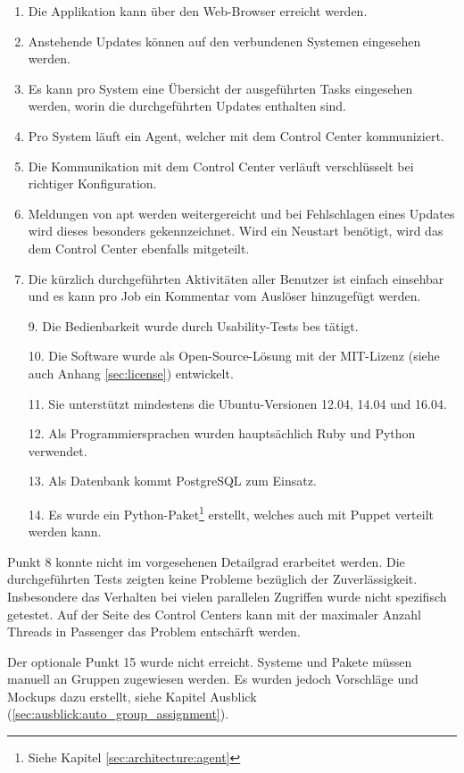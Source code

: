 \begin{enumerate}[noitemsep]
    \item Die Applikation kann über den Web-Browser erreicht werden.
    \item Anstehende Updates können auf den verbundenen Systemen eingesehen werden.
    \item Es kann pro System eine Übersicht der ausgeführten Tasks eingesehen werden, worin die durchgeführten Updates enthalten sind.
    \item Pro System läuft ein Agent, welcher mit dem Control Center kommuniziert.
    \item Die Kommunikation mit dem Control Center verläuft verschlüsselt bei richtiger Konfiguration.
    \item Meldungen von \gls{apt} werden weitergereicht und bei Fehlschlagen eines Updates wird dieses besonders gekennzeichnet. Wird ein Neustart benötigt, wird das dem Control Center ebenfalls mitgeteilt.
    \item Die kürzlich durchgeführten Aktivitäten aller Benutzer ist einfach einsehbar und es kann pro Job ein Kommentar vom Auslöser hinzugefügt werden.
    \item [9.] Die Bedienbarkeit wurde durch Usability-Tests bes    tätigt.
    \item [10.] Die Software wurde als Open-Source-Lösung mit der MIT-Lizenz (siehe auch Anhang \ref{sec:license}) entwickelt.
    \item [11.] Sie unterstützt mindestens die Ubuntu-Versionen 12.04, 14.04 und 16.04.
    \item [12.] Als Programmiersprachen wurden hauptsächlich Ruby und Python verwendet.
    \item [13.] Als Datenbank kommt PostgreSQL zum Einsatz.
    \item [14.] Es wurde ein Python-Paket\footnote{Siehe Kapitel \ref{sec:architecture:agent}} erstellt, welches auch mit Puppet verteilt werden kann.
\end{enumerate}

Punkt 8 konnte nicht im vorgesehenen Detailgrad erarbeitet werden. Die durchgeführten Tests zeigten keine Probleme bezüglich der Zuverlässigkeit. Insbesondere das Verhalten bei vielen parallelen Zugriffen wurde nicht spezifisch getestet. Auf der Seite des Control Centers kann mit der maximaler Anzahl Threads in Passenger das Problem entschärft werden.

Der optionale Punkt 15 wurde nicht erreicht. Systeme und Pakete müssen manuell an Gruppen zugewiesen werden. Es wurden jedoch Vorschläge und Mockups dazu erstellt, siehe Kapitel Ausblick (\ref{sec:ausblick:auto_group_assignment}).

